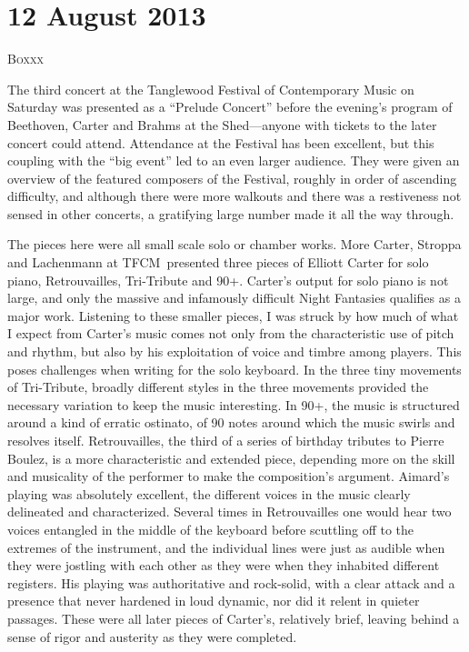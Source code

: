 \chapter{12 August 2013}

\textsc{Boxxx}

The third concert at the Tanglewood Festival of Contemporary Music on Saturday was presented as a “Prelude Concert” before the evening’s program of Beethoven, Carter and Brahms at the Shed—anyone with tickets to the later concert could attend. Attendance at the Festival has been excellent, but this coupling with the “big event” led to an even larger audience. They were given an overview of the featured composers of the Festival, roughly in order of ascending difficulty, and although there were more walkouts and there was a restiveness not sensed in other concerts, a gratifying large number made it all the way through.

The pieces here were all small scale solo or chamber works. More Carter, Stroppa and Lachenmann at TFCM presented three pieces of Elliott Carter for solo piano, Retrouvailles, Tri-Tribute and 90+. Carter’s output for solo piano is not large, and only the massive and infamously difficult Night Fantasies qualifies as a major work. Listening to these smaller pieces, I was struck by how much of what I expect from Carter’s music comes not only from the characteristic use of pitch and rhythm, but also by his exploitation of voice and timbre among players. This poses challenges when writing for the solo keyboard. In the three tiny movements of Tri-Tribute, broadly different styles in the three movements provided the necessary variation to keep the music interesting. In 90+, the music is structured around a kind of erratic ostinato, of 90 notes around which the music swirls and resolves itself. Retrouvailles, the third of a series of birthday tributes to Pierre Boulez, is a more characteristic and extended piece, depending more on the skill and musicality of the performer to make the composition’s argument. Aimard’s playing was absolutely excellent, the different voices in the music clearly delineated and characterized. Several times in Retrouvailles one would hear two voices entangled in the middle of the keyboard before scuttling off to the extremes of the instrument, and the individual lines were just as audible when they were jostling with each other as they were when they inhabited different registers. His playing was authoritative and rock-solid, with a clear attack and a presence that never hardened in loud dynamic, nor did it relent in quieter passages. These were all later pieces of Carter’s, relatively brief, leaving behind a sense of rigor and austerity as they were completed.

